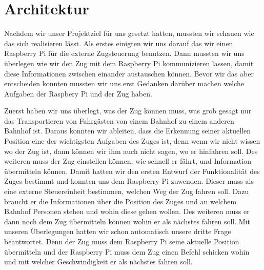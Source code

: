 \chapter{Architektur}
Nachdem wir unser Projektziel für uns gesetzt hatten, mussten wir schauen wie das sich realisieren lässt. Als erstes einigten wir uns darauf das wir einen Raspberry Pi für die externe Zugsteuerung benutzen. Dann mussten wir uns überlegen wie wir den Zug mit dem Raspberry Pi kommunizieren lassen, damit diese Informationen zwischen einander austauschen können. Bevor wir das aber entscheiden konnten mussten wir uns erst Gedanken darüber machen welche Aufgaben der Raspbery Pi und der Zug haben.

Zuerst haben wir uns überlegt, was der Zug können muss, was grob gesagt nur das Transportieren von Fahrgästen von einem Bahnhof zu einem anderen Bahnhof ist. Daraus konnten wir ableiten, dass die Erkennung seiner aktuellen Position eine der wichtigsten Aufgaben des Zuges ist, denn wenn wir nicht wissen wo der Zug ist, dann können wir ihm auch nicht sagen, wo er hinfahren soll. Des weiteren muss der Zug einstellen können, wie schnell er fährt, und Information übermitteln können. Damit hatten wir den ersten Entwurf der Funktionalität des Zuges bestimmt und konnten uns dem Raspberry Pi zuwenden. Dieser muss als eine externe Steuereinheit bestimmen, welchen Weg der Zug fahren soll. Dazu braucht er die Informationen über die Position des Zuges und an welchem Bahnhof Personen stehen und wohin diese gehen wollen. Des weiteren muss er dann noch dem Zug übermitteln können wohin er als nächstes fahren soll. Mit unseren Überlegungen hatten wir schon automatisch unsere dritte Frage beantwortet. Denn der Zug muss dem Raspberry Pi seine aktuelle Position übermitteln und der Raspberry Pi muss dem Zug einen Befehl schicken wohin und mit welcher Geschwindigkeit er als nächstes fahren soll. 




